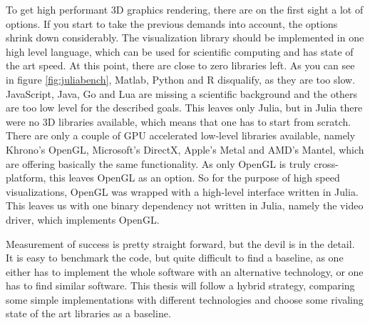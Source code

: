To get high performant 3D graphics rendering, there are on the first sight a lot of options.
If you start to take the previous demands into account, the options shrink down considerably.
The visualization library should be implemented in one high level language, which can be used for scientific computing and has state of the art speed. 
At this point, there are close to zero libraries left. As you can see in figure \ref{fig:juliabench}, Matlab, Python and R disqualify, as they are too slow. JavaScript, Java, Go and Lua are missing a scientific background and the others are too low level for the described goals.
This leaves only Julia, but in Julia there were no 3D libraries available, which means that one has to start from scratch.
There are only a couple of GPU accelerated low-level libraries available, namely Khrono's \ac{OpenGL}, Microsoft's DirectX, Apple's Metal and AMD's Mantel, which are offering basically the same functionality. 
As only \ac{OpenGL} is truly cross-platform, this leaves \ac{OpenGL} as an option.
So for the purpose of high speed visualizations, \ac{OpenGL} was wrapped with a high-level interface written in Julia. This leaves us with one binary dependency not written in Julia, namely the video driver, which implements \ac{OpenGL}.

Measurement of success is pretty straight forward, but the devil is in the detail.
It is easy to benchmark the code, but quite difficult to find a baseline, as one either has to implement the whole software with an alternative technology, or one has to find similar software.
This thesis will follow a hybrid strategy, comparing some simple implementations with different technologies and choose some rivaling state of the art libraries as a baseline.

